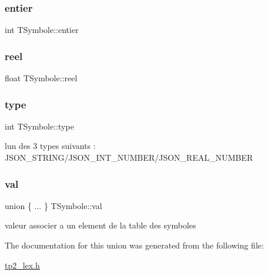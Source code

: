 \mbox{\label{structTSymbole_a3b836b307d4dec1ad2cf5790f0d179cb}} 
\subsubsection{\texorpdfstring{entier}{entier}}
{\footnotesize\ttfamily int T\+Symbole\+::entier}

\mbox{\label{structTSymbole_afc2415b8445e939938f13807dad56550}} 
\subsubsection{\texorpdfstring{reel}{reel}}
{\footnotesize\ttfamily float T\+Symbole\+::reel}

\mbox{\label{structTSymbole_a3f1c09d456d42f56c7e97b767fcda611}} 
\subsubsection{\texorpdfstring{type}{type}}
{\footnotesize\ttfamily int T\+Symbole\+::type}

l\textquotesingle{}un des 3 types suivants \+: J\+S\+O\+N\+\_\+\+S\+T\+R\+I\+N\+G/\+J\+S\+O\+N\+\_\+\+I\+N\+T\+\_\+\+N\+U\+M\+B\+E\+R/\+J\+S\+O\+N\+\_\+\+R\+E\+A\+L\+\_\+\+N\+U\+M\+B\+ER \mbox{\label{structTSymbole_a448dc40c2c8e5d050436fa598f528723}} 
\subsubsection{\texorpdfstring{val}{val}}
{\footnotesize\ttfamily union \{ ... \}   T\+Symbole\+::val}

valeur associer a un element de la table des symboles 

The documentation for this union was generated from the following file\+:\begin{DoxyCompactItemize}
\item 
\hyperlink{tp2__lex_8h}{tp2\+\_\+lex.\+h}\end{DoxyCompactItemize}

